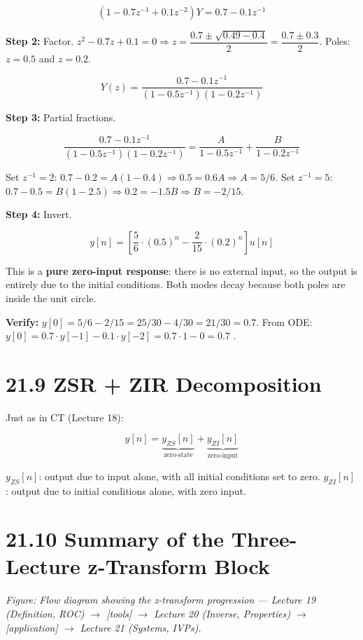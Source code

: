 \documentclass[11pt]{article}
\begin{document}
\[(1 - 0.7 z^{-1} + 0.1 z^{-2}) Y = 0.7 - 0.1 z^{-1}\]

\textbf{Step 2:} Factor. $z^2 - 0.7 z + 0.1 = 0 \Rightarrow z = \dfrac{0.7 \pm \sqrt{0.49 - 0.4}}{2} = \dfrac{0.7 \pm 0.3}{2}$. Poles: $z = 0.5$ and $z = 0.2$.

\[Y(z) = \frac{0.7 - 0.1 z^{-1}}{(1 - 0.5 z^{-1})(1 - 0.2 z^{-1})}\]

\textbf{Step 3:} Partial fractions.

\[\frac{0.7 - 0.1 z^{-1}}{(1 - 0.5 z^{-1})(1 - 0.2 z^{-1})} = \frac{A}{1 - 0.5 z^{-1}} + \frac{B}{1 - 0.2 z^{-1}}\]

Set $z^{-1} = 2$: $0.7 - 0.2 = A(1 - 0.4) \Rightarrow 0.5 = 0.6 A \Rightarrow A = 5/6$.
Set $z^{-1} = 5$: $0.7 - 0.5 = B(1 - 2.5) \Rightarrow 0.2 = -1.5 B \Rightarrow B = -2/15$.

\textbf{Step 4:} Invert.

\[y[n] = \left[\frac{5}{6} \cdot (0.5)^n - \frac{2}{15} \cdot (0.2)^n\right] u[n]\]

This is a \textbf{pure zero-input response}: there is no external input, so the output is entirely due to the initial conditions. Both modes decay because both poles are inside the unit circle.

\textbf{Verify:} $y[0] = 5/6 - 2/15 = 25/30 - 4/30 = 21/30 = 0.7$. From ODE: $y[0] = 0.7 \cdot y[-1] - 0.1 \cdot y[-2] = 0.7 \cdot 1 - 0 = 0.7$ \checkmark.

\section*{21.9 ZSR + ZIR Decomposition}

Just as in CT (Lecture 18):

\[y[n] = \underbrace{y_{ZS}[n]}_{\text{zero-state}} + \underbrace{y_{ZI}[n]}_{\text{zero-input}}\]

$y_{ZS}[n]$: output due to input alone, with all initial conditions set to zero.
$y_{ZI}[n]$: output due to initial conditions alone, with zero input.

\section*{21.10 Summary of the Three-Lecture z-Transform Block}

\textit{Figure: Flow diagram showing the z-transform progression — Lecture 19 (Definition, ROC) $\to$ [tools] $\to$ Lecture 20 (Inverse, Properties) $\to$ [application] $\to$ Lecture 21 (Systems, IVPs).}
\end{document}
